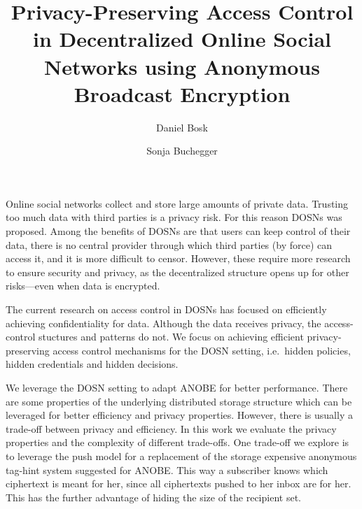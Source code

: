 \title{%
  Privacy-Preserving Access Control in
  Decentralized Online Social Networks using
  Anonymous Broadcast Encryption
}
\author{%
  Daniel Bosk \and
  Sonja Buchegger
}

\maketitle

Online social networks collect and store large amounts of private data.
Trusting too much data with third parties is a privacy risk.
For this reason \acp{DOSN} was proposed.
Among the benefits of \acp{DOSN} are that users can keep control of their data, 
there is no central provider through which third parties (by force) can access 
it, and it is more difficult to censor.
However, these require more research to ensure security and privacy, as the 
decentralized structure opens up for other risks---even when data is encrypted.

The current research on access control in \acp{DOSN} has focused on 
efficiently achieving confidentiality for data.
Although the data receives privacy, the access-control stuctures and patterns 
do not.
We focus on achieving efficient privacy-preserving access control mechanisms 
for the \ac{DOSN} setting, i.e.~hidden policies, hidden credentials and 
hidden decisions.

We leverage the \ac{DOSN} setting to adapt \ac{ANOBE} for better performance.
There are some properties of the underlying distributed storage structure which 
can be leveraged for better efficiency and privacy properties.
However, there is usually a trade-off between privacy and efficiency.
In this work we evaluate the privacy properties and the complexity of different 
trade-offs.
One trade-off we explore is to leverage the push model for a replacement of the 
storage expensive anonymous tag-hint system suggested for \ac{ANOBE}.
This way a subscriber knows which ciphertext is meant for her, since all 
ciphertexts pushed to her inbox are for her.
This has the further advantage of hiding the size of the recipient set.

